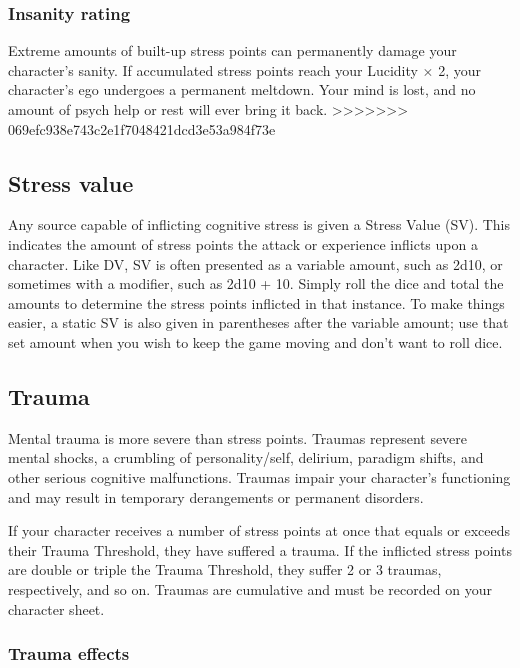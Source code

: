 \subsubsection{Insanity rating}

Extreme amounts of built-up stress points can permanently damage your character’s sanity. If accumulated stress points reach your Lucidity $\times$ 2, your character’s ego undergoes a permanent meltdown. Your mind is lost, and no amount of psych help or rest will ever bring it back.
>>>>>>> 069efc938e743c2e1f7048421dcd3e53a984f73e


\subsection{Stress value}
\label{sec:stress-value}

Any source capable of inflicting cognitive stress is given a Stress Value (SV). This indicates the amount of stress points the attack or experience inflicts upon a character. Like DV, SV is often presented as a variable amount, such as 2d10, or sometimes with a modifier, such as 2d10 + 10. Simply roll the dice and total the amounts to determine the stress points inflicted in that instance. To make things easier, a static SV is also given in parentheses after the variable amount; use that set amount when you wish to keep the game moving and don’t want to roll dice.


\subsection{Trauma}
\label{sec:trauma}

Mental trauma is more severe than stress points. Traumas represent severe mental shocks, a crumbling of personality/self, delirium, paradigm shifts, and other serious cognitive malfunctions. Traumas impair your character’s functioning and may result in temporary derangements or permanent disorders.

If your character receives a number of stress points at once that equals or exceeds their Trauma Threshold, they have suffered a trauma. If the inflicted stress points are double or triple the Trauma Threshold, they suffer 2 or 3 traumas, respectively, and so on. Traumas are cumulative and must be recorded on your character sheet.

\subsubsection{Trauma effects}

